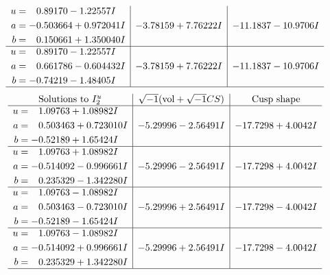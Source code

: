 \documentclass[1p]{elsarticle_modified}
\theoremstyle{definition}
\newcommand{\I}{\sqrt{-1}}
\begin{document}
$$\begin{array}{c|c|c}
\begin{aligned}
u &= \phantom{-}0.89170 - 1.22557 I \\
a &= -0.503664 + 0.972041 I \\
b &= \phantom{-}0.150661 + 1.350040 I\end{aligned}
 & -3.78159 + 7.76222 I & -11.1837 - 10.9706 I \\ \hline\begin{aligned}
u &= \phantom{-}0.89170 - 1.22557 I \\
a &= \phantom{-}0.661786 - 0.604432 I \\
b &= -0.74219 - 1.48405 I\end{aligned}
 & -3.78159 + 7.76222 I & -11.1837 - 10.9706 I\\
 \hline 
 \end{array}$$\newpage$$\begin{array}{c|c|c}  
\text{Solutions to }I^u_{2}& \I (\text{vol} + \sqrt{-1}CS) & \text{Cusp shape}\\
 \hline 
\begin{aligned}
u &= \phantom{-}1.09763 + 1.08982 I \\
a &= \phantom{-}0.503463 + 0.723010 I \\
b &= -0.52189 + 1.65424 I\end{aligned}
 & -5.29996 - 2.56491 I & -17.7298 + 4.0042 I \\ \hline\begin{aligned}
u &= \phantom{-}1.09763 + 1.08982 I \\
a &= -0.514092 - 0.996661 I \\
b &= \phantom{-}0.235329 - 1.342280 I\end{aligned}
 & -5.29996 - 2.56491 I & -17.7298 + 4.0042 I \\ \hline\begin{aligned}
u &= \phantom{-}1.09763 - 1.08982 I \\
a &= \phantom{-}0.503463 - 0.723010 I \\
b &= -0.52189 - 1.65424 I\end{aligned}
 & -5.29996 + 2.56491 I & -17.7298 - 4.0042 I \\ \hline\begin{aligned}
u &= \phantom{-}1.09763 - 1.08982 I \\
a &= -0.514092 + 0.996661 I \\
b &= \phantom{-}0.235329 + 1.342280 I\end{aligned}
 & -5.29996 + 2.56491 I & -17.7298 - 4.0042 I\\
 \hline 
 \end{array}$$\newpage\newpage\renewcommand{\arraystretch}{1}
\end{document}
